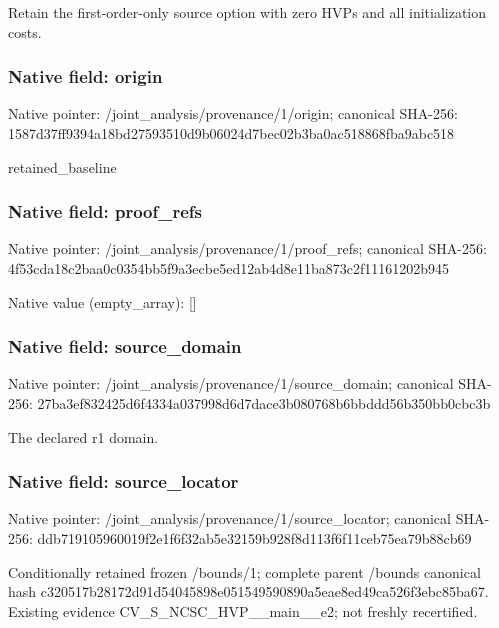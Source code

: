 \documentclass[10pt,a4paper]{article}
\begin{document}
\begingroup\raggedright\sloppy Retain the first-order-only source option with zero HVPs and all initialization costs.\par\endgroup

\subsubsection{Native field: origin}
Native pointer: /joint\_\allowbreak{}analysis/provenance/1/origin; canonical SHA-256: 1587d37ff9394a18bd27593510d9b06024d7bec02b3ba0ac518868fba9abc518

\begingroup\raggedright\sloppy retained\_\allowbreak{}baseline\par\endgroup

\subsubsection{Native field: proof\_\allowbreak{}refs}
Native pointer: /joint\_\allowbreak{}analysis/provenance/1/proof\_\allowbreak{}refs; canonical SHA-256: 4f53cda18c2baa0c0354bb5f9a3ecbe5ed12ab4d8e11ba873c2f11161202b945

Native value (empty\_\allowbreak{}array): []

\subsubsection{Native field: source\_\allowbreak{}domain}
Native pointer: /joint\_\allowbreak{}analysis/provenance/1/source\_\allowbreak{}domain; canonical SHA-256: 27ba3ef832425d6f4334a037998d6d7dace3b080768b6bbddd56b350bb0cbc3b

\begingroup\raggedright\sloppy The declared r1 domain.\par\endgroup

\subsubsection{Native field: source\_\allowbreak{}locator}
Native pointer: /joint\_\allowbreak{}analysis/provenance/1/source\_\allowbreak{}locator; canonical SHA-256: ddb719105960019f2e1f6f32ab5e32159b928f8d113f6f11ceb75ea79b88cb69

\begingroup\raggedright\sloppy Conditionally retained frozen /\allowbreak{}bounds/\allowbreak{}1;\allowbreak{} complete parent /\allowbreak{}bounds canonical hash c320517b28172d91d54045898e051549590890a5eae8ed49ca526f3ebc85ba67. Existing evidence CV\_\allowbreak{}S\_\allowbreak{}NCSC\_\allowbreak{}HVP\_\allowbreak{}\_\allowbreak{}main\_\allowbreak{}\_\allowbreak{}e2;\allowbreak{} not freshly recertified.\par\endgroup
\end{document}
